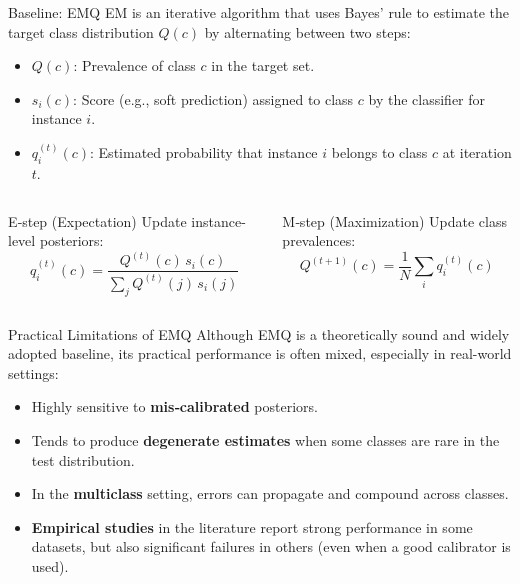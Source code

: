 \documentclass[aspectratio=169]{beamer}
\begin{document}
\begin{frame}{Baseline: EMQ}
  EM is an iterative algorithm that uses Bayes’ rule to estimate the target class distribution $Q(c)$ by alternating between two steps:
  
  \begin{itemize}
    \item $Q(c)$: Prevalence of class $c$ in the target set.
    \item $s_i(c)$: Score (e.g., soft prediction) assigned to class $c$ by the classifier for instance $i$.
    \item $q_i^{(t)}(c)$: Estimated probability that instance $i$ belongs to class $c$ at iteration $t$.
  \end{itemize}

  \begin{columns}
    \begin{column}{0.4\textwidth}
      \begin{block}{E‑step (Expectation)}
        \small
        Update instance-level posteriors:
        $$q_i^{(t)}(c)=\frac{Q^{(t)}(c)\,s_i(c)}{\sum_{j}Q^{(t)}(j)\,s_i(j)}$$
      \end{block}
    \end{column}
    \begin{column}{0.4\textwidth}
      \begin{block}{M‑step (Maximization)}
        \small
        Update class prevalences:
        $$Q^{(t+1)}(c)=\frac{1}{N}\sum_i q_i^{(t)}(c)$$
      \end{block}
    \end{column}
  \end{columns}
\end{frame}


\begin{frame}{Practical Limitations of EMQ}
  Although EMQ is a theoretically sound and widely adopted baseline, its practical performance is often mixed, especially in real-world settings:

  \begin{itemize}
    \item Highly sensitive to \textbf{mis‑calibrated} posteriors.
    \item Tends to produce \textbf{degenerate estimates} when some classes are rare in the test distribution.
    \item In the \textbf{multiclass} setting, errors can propagate and compound across classes.
    \item \textbf{Empirical studies} in the literature report strong performance in some datasets, but also significant failures in others (even when a good calibrator is used).
  \end{itemize}
\end{frame}
\end{document}
